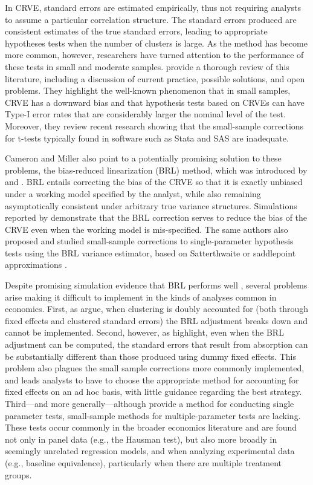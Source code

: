 \documentclass[12pt]{article}\usepackage[]{graphicx}\usepackage[]{color}
\begin{document}
In CRVE, standard errors are estimated empirically, thus not requiring analysts to assume a particular correlation structure.
The standard errors produced are consistent estimates of the true standard errors, leading to appropriate hypotheses tests when the number of clusters is large.
As the method has become more common, however, researchers have turned attention to the performance of these tests in small and moderate samples. 
\citet{Cameron2015practitioners} provide a thorough review of this literature, including a discussion of current practice, possible solutions, and open problems. 
They highlight the well-known phenomenon that in small samples, CRVE has a downward bias and that hypothesis tests based on CRVEs can have Type-I error rates that are considerably larger the nominal level of the test.
Moreover, they review recent research showing that the small-sample corrections for t-tests typically found in software such as Stata and SAS are inadequate. 

Cameron and Miller also point to a potentially promising solution to these problems, the bias-reduced linearization (BRL) method, which was introduced by \citet{McCaffrey2001generalizations} and \citet{Bell2002bias}. 
BRL entails correcting the bias of the CRVE so that it is exactly unbiased under a working model specified by the analyst, while also remaining asymptotically consistent under arbitrary true variance structures. 
Simulations reported by \citet{Bell2002bias} demonstrate that the BRL correction serves to reduce the bias of the CRVE even when the working model is mis-specified. 
The same authors also proposed and studied small-sample corrections to single-parameter hypothesis tests using the BRL variance estimator, based on Satterthwaite \citep{Bell2002bias} or saddlepoint approximations \citep{McCaffrey2006improved}.

Despite promising simulation evidence that BRL performs well \citep[e.g.,][]{Imbens2012robust}, several problems arise making it difficult to implement in the kinds of analyses common in economics. 
First, as \citet{Angrist2009mostly} argue, when clustering is doubly accounted for (both through fixed effects and clustered standard errors) the BRL adjustment breaks down and cannot be implemented.
Second, however, as \citet{Cameron2015practitioners} highlight, even when the BRL adjustment can be computed, the standard errors that result from absorption can be substantially different than those produced using dummy fixed effects. 
This problem also plagues the small sample corrections more commonly implemented, and leads analysts to have to choose the appropriate method for accounting for fixed effects on an ad hoc basis, with little guidance regarding the best strategy.
Third---and more generally---although \citet{Bell2002bias} provide a method for conducting single parameter tests, small-sample methods for multiple-parameter tests are lacking.
These tests occur commonly in the broader economics literature and are found not only in panel data (e.g., the Hausman test), but also more broadly in seemingly unrelated regression models, and when analyzing experimental data (e.g., baseline equivalence), particularly when there are multiple treatment groups. 
\end{document}
